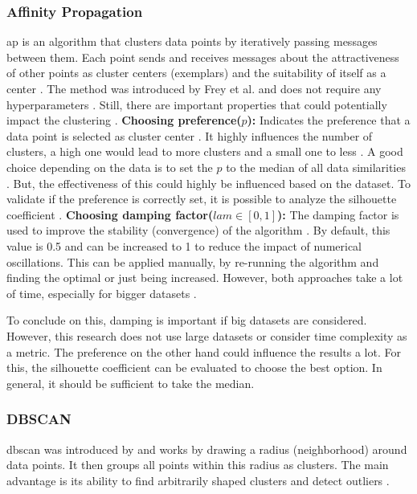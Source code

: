 \subsubsection{Affinity Propagation}
\gls{ap} is an algorithm that clusters data points by iteratively passing messages between them.
Each point sends and receives messages about the attractiveness of other points as cluster centers (exemplars) and the suitability of itself as a center \citep{keller_balancing_2021}.
The method was introduced by Frey et al. and does not require any hyperparameters \citep{frey_clustering_2007}.
Still, there are important properties that could potentially impact the clustering \citep{wang_adaptive_2007}. \newline
\textbf{Choosing preference($p$): }
Indicates the preference that a data point is selected as cluster center \citep{wang_adaptive_2007}.
It highly influences the number of clusters, a high one would lead to more clusters and a small one to less \citep{moiane_evaluation_2018}.
A good choice depending on the data is to set the $p$ to the median of all data similarities \citep{wang_adaptive_2007}.
But, the effectiveness of this could highly be influenced based on the dataset.
To validate if the preference is correctly set, it is possible to analyze the silhouette coefficient \citep{moiane_evaluation_2018}.
\newline
\textbf{Choosing damping factor($lam \in [0,1] $):}
The damping factor is used to improve the stability (convergence) of the algorithm \citep{wang_adaptive_2007}.
By default, this value is 0.5 and can be increased to 1 to reduce the impact of numerical oscillations.
This can be applied manually, by re-running the algorithm and finding the optimal or just being increased.
However, both approaches take a lot of time, especially for bigger datasets \citep{wang_adaptive_2007}. \newline

To conclude on this, damping is important if big datasets are considered.
However, this research does not use large datasets or consider time complexity as a metric.
The preference on the other hand could influence the results a lot.
For this, the silhouette coefficient can be evaluated to choose the best option.
In general, it should be sufficient to take the median.
\subsubsection{DBSCAN}
\gls{dbscan} was introduced by \citep{ester_density-based_nodate} and works by drawing a radius (neighborhood) around data points.
It then groups all points within this radius as clusters. The main advantage is its ability to find arbitrarily shaped clusters and detect outliers \citep{liu_privacy_2012}.

